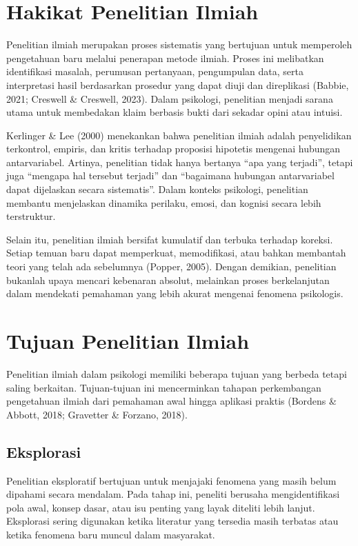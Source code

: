 \documentclass[
  indonesian,
  letterpaper,
  DIV=11,
  numbers=noendperiod]{scrreprt}
\begin{document}
\section{Hakikat Penelitian Ilmiah}\label{hakikat-penelitian-ilmiah}

Penelitian ilmiah merupakan proses sistematis yang bertujuan untuk
memperoleh pengetahuan baru melalui penerapan metode ilmiah. Proses ini
melibatkan identifikasi masalah, perumusan pertanyaan, pengumpulan data,
serta interpretasi hasil berdasarkan prosedur yang dapat diuji dan
direplikasi (Babbie, 2021; Creswell \& Creswell, 2023). Dalam psikologi,
penelitian menjadi sarana utama untuk membedakan klaim berbasis bukti
dari sekadar opini atau intuisi.

Kerlinger \& Lee (2000) menekankan bahwa penelitian ilmiah adalah
penyelidikan terkontrol, empiris, dan kritis terhadap proposisi
hipotetis mengenai hubungan antarvariabel. Artinya, penelitian tidak
hanya bertanya ``apa yang terjadi'', tetapi juga ``mengapa hal tersebut
terjadi'' dan ``bagaimana hubungan antarvariabel dapat dijelaskan secara
sistematis''. Dalam konteks psikologi, penelitian membantu menjelaskan
dinamika perilaku, emosi, dan kognisi secara lebih terstruktur.

Selain itu, penelitian ilmiah bersifat kumulatif dan terbuka terhadap
koreksi. Setiap temuan baru dapat memperkuat, memodifikasi, atau bahkan
membantah teori yang telah ada sebelumnya (Popper, 2005). Dengan
demikian, penelitian bukanlah upaya mencari kebenaran absolut, melainkan
proses berkelanjutan dalam mendekati pemahaman yang lebih akurat
mengenai fenomena psikologis.

\section{Tujuan Penelitian Ilmiah}\label{tujuan-penelitian-ilmiah}

Penelitian ilmiah dalam psikologi memiliki beberapa tujuan yang berbeda
tetapi saling berkaitan. Tujuan-tujuan ini mencerminkan tahapan
perkembangan pengetahuan ilmiah dari pemahaman awal hingga aplikasi
praktis (Bordens \& Abbott, 2018; Gravetter \& Forzano, 2018).

\subsection{Eksplorasi}\label{eksplorasi}

Penelitian eksploratif bertujuan untuk menjajaki fenomena yang masih
belum dipahami secara mendalam. Pada tahap ini, peneliti berusaha
mengidentifikasi pola awal, konsep dasar, atau isu penting yang layak
diteliti lebih lanjut. Eksplorasi sering digunakan ketika literatur yang
tersedia masih terbatas atau ketika fenomena baru muncul dalam
masyarakat.
\end{document}
